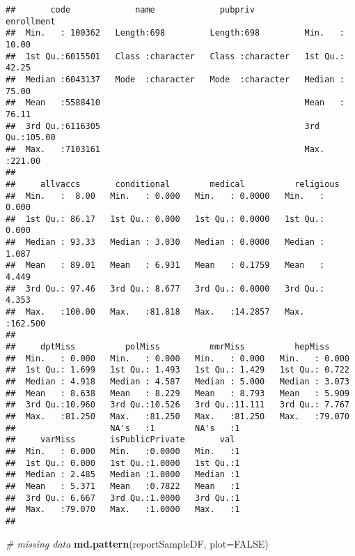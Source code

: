 \documentclass[]{article}
\newenvironment{Shaded}{\begin{snugshade}}{\end{snugshade}}
\newcommand{\CommentTok}[1]{\textcolor[rgb]{0.56,0.35,0.01}{\textit{#1}}}
\newcommand{\DataTypeTok}[1]{\textcolor[rgb]{0.13,0.29,0.53}{#1}}
\newcommand{\KeywordTok}[1]{\textcolor[rgb]{0.13,0.29,0.53}{\textbf{#1}}}
\newcommand{\NormalTok}[1]{#1}
\newcommand{\OtherTok}[1]{\textcolor[rgb]{0.56,0.35,0.01}{#1}}
\begin{document}
\begin{verbatim}
##       code             name             pubpriv            enrollment    
##  Min.   : 100362   Length:698         Length:698         Min.   : 10.00  
##  1st Qu.:6015501   Class :character   Class :character   1st Qu.: 42.25  
##  Median :6043137   Mode  :character   Mode  :character   Median : 75.00  
##  Mean   :5588410                                         Mean   : 76.11  
##  3rd Qu.:6116305                                         3rd Qu.:105.00  
##  Max.   :7103161                                         Max.   :221.00  
##                                                                          
##     allvaccs       conditional        medical          religious      
##  Min.   :  8.00   Min.   : 0.000   Min.   : 0.0000   Min.   :  0.000  
##  1st Qu.: 86.17   1st Qu.: 0.000   1st Qu.: 0.0000   1st Qu.:  0.000  
##  Median : 93.33   Median : 3.030   Median : 0.0000   Median :  1.087  
##  Mean   : 89.01   Mean   : 6.931   Mean   : 0.1759   Mean   :  4.449  
##  3rd Qu.: 97.46   3rd Qu.: 8.677   3rd Qu.: 0.0000   3rd Qu.:  4.353  
##  Max.   :100.00   Max.   :81.818   Max.   :14.2857   Max.   :162.500  
##                                                                       
##     dptMiss          polMiss          mmrMiss          hepMiss      
##  Min.   : 0.000   Min.   : 0.000   Min.   : 0.000   Min.   : 0.000  
##  1st Qu.: 1.699   1st Qu.: 1.493   1st Qu.: 1.429   1st Qu.: 0.722  
##  Median : 4.918   Median : 4.587   Median : 5.000   Median : 3.073  
##  Mean   : 8.638   Mean   : 8.229   Mean   : 8.793   Mean   : 5.909  
##  3rd Qu.:10.960   3rd Qu.:10.526   3rd Qu.:11.111   3rd Qu.: 7.767  
##  Max.   :81.250   Max.   :81.250   Max.   :81.250   Max.   :79.070  
##                   NA's   :1        NA's   :1                        
##     varMiss       isPublicPrivate       val   
##  Min.   : 0.000   Min.   :0.0000   Min.   :1  
##  1st Qu.: 0.000   1st Qu.:1.0000   1st Qu.:1  
##  Median : 2.485   Median :1.0000   Median :1  
##  Mean   : 5.371   Mean   :0.7822   Mean   :1  
##  3rd Qu.: 6.667   3rd Qu.:1.0000   3rd Qu.:1  
##  Max.   :79.070   Max.   :1.0000   Max.   :1  
## 
\end{verbatim}

\begin{Shaded}
\begin{Highlighting}[]
\CommentTok{# missing data }
\KeywordTok{md.pattern}\NormalTok{(reportSampleDF, }\DataTypeTok{plot=}\OtherTok{FALSE}\NormalTok{)}
\end{Highlighting}
\end{Shaded}
\end{document}
